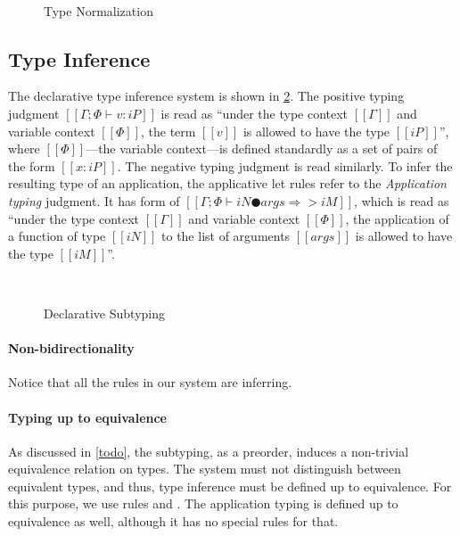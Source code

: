 \begin{figure}[h]
  \label{alg:type-nf}
  \hfill
  
  \begin{multicols}{2}
  \ottdefnNrmNNorm{}
  \columnbreak\\
  \ottdefnNrmPNorm{}
  \end{multicols}
  \caption{Type Normalization}
  \label{fig:type-nf}
\end{figure}



\subsection{Type Inference}

The declarative type inference system is shown in \cref{fig:declarative-inference}.
The positive typing judgment $[[Γ ; Φ ⊢ v : iP]]$ is read as 
``under the type context $[[Γ]]$ and variable context $[[Φ]]$,
the term $[[v]]$ is allowed to have the type $[[iP]]$'',
where $[[Φ]]$---the variable context---is defined standardly as
a set of pairs of the form $[[x : iP]]$. 
The negative typing judgment is read similarly.
To infer the resulting type of an application, the
applicative let rules refer to the \emph{Application typing} judgment.
It has form of $[[Γ ; Φ ⊢ iN ● args ⇒> iM]]$, 
which is read as ``under the type context $[[Γ]]$ and variable context $[[Φ]]$,
the application of a function of type $[[iN]]$ to the list of arguments $[[args]]$
is allowed to have the type $[[iM]]$''.

\begin{figure}[h]
  \ottdefnDTNInf{}

  \hfill

  \begin{multicols}{2}
  \ottdefnDTPInf{}
  \\
  \ottdefnDTSpinInf{}
  \end{multicols}
  \hfill

  \caption{Declarative Subtyping}
  \label{fig:declarative-inference}
\end{figure}

\paragraph{Non-bidirectionality}
  Notice that all the rules in our system are inferring.

\paragraph{Typing up to equivalence}
  As discussed in \cref{todo}, the subtyping, as a preorder, 
  induces a non-trivial equivalence relation on types. 
  The system must not distinguish between equivalent types,
  and thus, type inference must be defined up to equivalence. 
  For this purpose, we use rules   
  and .
  The application typing is defined up to equivalence as well,
  although it has no special rules for that.

